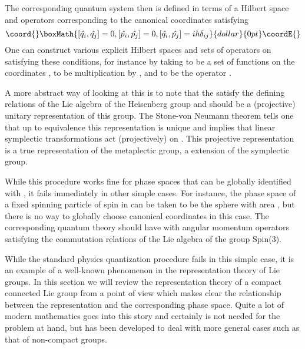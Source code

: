 \documentclass[a4paper,a4paper]{article}
\theoremstyle{conjecture}
\begin{document}
The corresponding quantum system then is defined in terms of
a Hilbert space \coordHE{} and operators corresponding to the
canonical coordinates satisfying
$$\coord{}\boxMath{[\hat{q_i}, \hat{q_j}]=0, [\hat{p_i},\hat{p_j}]=0, [\hat{q_i},\hat{p_j}]=i\hbar\delta_{ij}}{dollar}{0pt}\coordE{}$$
One can construct various explicit Hilbert spaces \coordHE{} and sets of operators
on \coordHE{} satisfying these conditions, for instance by taking
\coordHE{} to be a set of functions on the coordinates \coordHE{}, \coordHE{} to be multiplication
by \coordHE{}, and \coordHE{} to be the operator \coordHE{}.

A more abstract way of looking at this is to note that the
\coordHE{} satisfy the defining relations of the Lie
algebra of the Heisenberg group and \coordHE{} should be a
(projective) unitary representation of this group. The Stone-von Neumann
theorem tells one that up to equivalence this representation is
unique and implies that linear symplectic transformations act
(projectively) on \coordHE{}. This projective representation is
a true representation of the metaplectic group, a \coordHE{}
extension of the symplectic group.

While this procedure works fine for phase spaces that can be globally identified with \coordHE{}, it fails immediately in other simple cases.  For instance, the phase space of a fixed
spinning particle of spin \coordHE{} in \coordHE{} can be taken to be the sphere \coordHE{}
with area \coordHE{}, but there is no way to globally choose canonical
coordinates in this case.  The corresponding quantum theory should have \coordHE{} with angular momentum operators \coordHE{} satisfying the commutation relations of
the Lie algebra of the group Spin(3).

While the standard physics quantization procedure fails in this
simple case, it is an example of a well-known phenomenon in the
representation theory of Lie groups.  In this section we will
review the representation theory of a compact connected Lie group
\coordHE{} from a point of view which makes clear the relationship
between the representation and the corresponding phase space.
Quite a lot of modern mathematics goes into this story and
certainly is not needed for the problem at hand, but has been
developed to deal with more general cases such as that of
non-compact groups.
\end{document}
